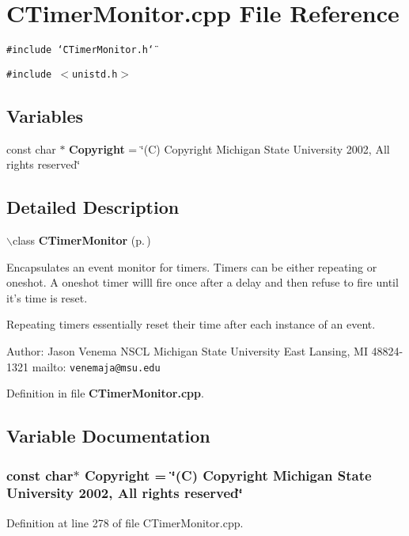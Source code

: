 \section{CTimer\-Monitor.cpp File Reference}
\label{CTimerMonitor_8cpp}
{\tt \#include \char`\"{}CTimer\-Monitor.h\char`\"{}}\par
{\tt \#include $<$unistd.h$>$}\par
\subsection*{Variables}
\begin{CompactItemize}
\item 
const char $\ast$ {\bf Copyright} = \char`\"{}(C) Copyright Michigan State University 2002, All rights reserved\char`\"{}
\end{CompactItemize}


\subsection{Detailed Description}


$\backslash$class {\bf CTimer\-Monitor} {\rm (p.\,\pageref{classCTimerMonitor})}

Encapsulates an event monitor for timers. Timers can be either repeating or oneshot. A oneshot timer willl fire once after a delay and  then refuse to fire until it's time is reset.

Repeating timers essentially reset their time after each instance of an event.

Author: Jason Venema NSCL Michigan State University East Lansing, MI 48824-1321 mailto: {\tt venemaja@msu.edu}



Definition in file {\bf CTimer\-Monitor.cpp}.

\subsection{Variable Documentation}
\subsubsection{\setlength{\rightskip}{0pt plus 5cm}const char$\ast$ Copyright = \char`\"{}(C) Copyright Michigan State University 2002, All rights reserved\char`\"{}\hspace{0.3cm}{\tt  [static]}}\label{CTimerMonitor_8cpp_a0}




Definition at line 278 of file CTimer\-Monitor.cpp.
